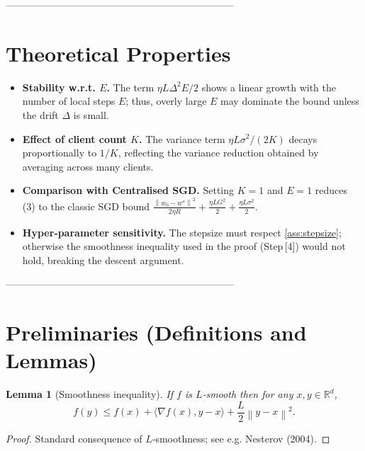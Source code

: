 \documentclass{article}
\newtheorem{lemma}{Lemma}
\newcommand{\RR}{\mathbb{R}}
\newcommand{\norm}[1]{\left\lVert#1\right\rVert}
\newcommand{\inner}[2]{\langle #1,#2\rangle}
\newcommand{\grad}{\nabla}
\begin{document}
---------------------------------------------------------------------

\section*{Theoretical Properties}
\begin{itemize}
    \item \textbf{Stability w.r.t. $E$.} The term $\eta L\Delta^2E/2$ shows a linear
          growth with the number of local steps $E$; thus, overly large $E$
          may dominate the bound unless the drift $\Delta$ is small.
    \item \textbf{Effect of client count $K$.} The variance term $\eta L\sigma^2/(2K)$
          decays proportionally to $1/K$, reflecting the variance reduction obtained
          by averaging across many clients.
    \item \textbf{Comparison with Centralised SGD.}
          Setting $K=1$ and $E=1$ reduces (3) to the classic SGD bound
          $\frac{\norm{w_0-w^\star}^2}{2\eta R}+ \frac{\eta L G^2}{2}
           +\frac{\eta L\sigma^2}{2}$.
    \item \textbf{Hyper‑parameter sensitivity.}
          The stepsize must respect \eqref{ass:stepsize}; otherwise the smoothness
          inequality used in the proof (Step [4]) would not hold, breaking the
          descent argument.
\end{itemize}

---------------------------------------------------------------------

\section*{Preliminaries (Definitions and Lemmas)}
\begin{lemma}[Smoothness inequality]\label{lem:smooth}
If $f$ is $L$‑smooth then for any $x,y\in\RR^d$,
\[
    f(y)\le f(x)+\inner{\grad f(x)}{y-x}
           +\frac{L}{2}\norm{y-x}^2 .
\] 
\end{lemma}
\begin{proof}
Standard consequence of $L$‑smoothness; see e.g. Nesterov (2004). \qedhere
\end{proof}
\end{document}
